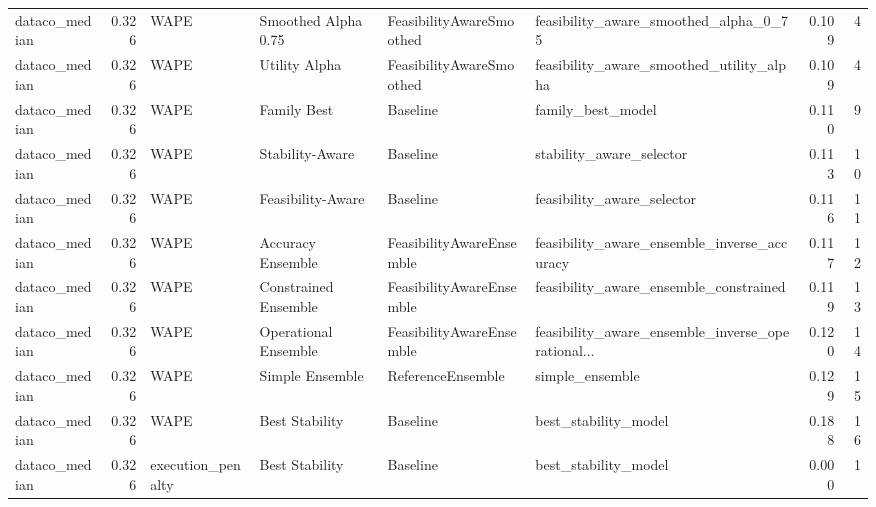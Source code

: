 \begin{table}
{\begin{tabular}{lrllllrr}
 dataco\_median &             0.326 &                        WAPE &   Smoothed Alpha 0.75 &  FeasibilityAwareSmoothed &              feasibility\_aware\_smoothed\_alpha\_0\_75 &         0.109 &               4 \\
 dataco\_median &             0.326 &                        WAPE &         Utility Alpha &  FeasibilityAwareSmoothed &           feasibility\_aware\_smoothed\_utility\_alpha &         0.109 &               4 \\
 dataco\_median &             0.326 &                        WAPE &           Family Best &                  Baseline &                                  family\_best\_model &         0.110 &               9 \\
 dataco\_median &             0.326 &                        WAPE &       Stability-Aware &                  Baseline &                           stability\_aware\_selector &         0.113 &              10 \\
 dataco\_median &             0.326 &                        WAPE &     Feasibility-Aware &                  Baseline &                         feasibility\_aware\_selector &         0.116 &              11 \\
 dataco\_median &             0.326 &                        WAPE &     Accuracy Ensemble &  FeasibilityAwareEnsemble &        feasibility\_aware\_ensemble\_inverse\_accuracy &         0.117 &              12 \\
 dataco\_median &             0.326 &                        WAPE &  Constrained Ensemble &  FeasibilityAwareEnsemble &             feasibility\_aware\_ensemble\_constrained &         0.119 &              13 \\
 dataco\_median &             0.326 &                        WAPE &  Operational Ensemble &  FeasibilityAwareEnsemble &  feasibility\_aware\_ensemble\_inverse\_operational... &         0.120 &              14 \\
 dataco\_median &             0.326 &                        WAPE &       Simple Ensemble &         ReferenceEnsemble &                                    simple\_ensemble &         0.129 &              15 \\
 dataco\_median &             0.326 &                        WAPE &        Best Stability &                  Baseline &                               best\_stability\_model &         0.188 &              16 \\
 dataco\_median &             0.326 &           execution\_penalty &        Best Stability &                  Baseline &                               best\_stability\_model &         0.000 &               1 \\

\end{tabular}}
\end{table}
